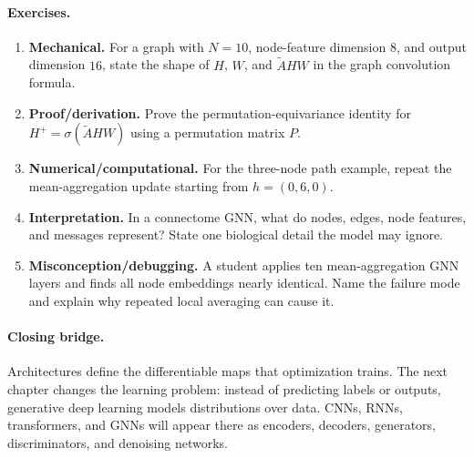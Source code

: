 \paragraph{Exercises.}
\begin{enumerate}[label=\textbf{40.4.\arabic*.}, leftmargin=*]
\item \textbf{Mechanical.} For a graph with \(N=10\), node-feature dimension \(8\), and output dimension \(16\), state the shape of \(H\), \(W\), and \(\widetilde AHW\) in the graph convolution formula.
\item \textbf{Proof/derivation.} Prove the permutation-equivariance identity for \(H^{+}=\sigma(\widetilde AHW)\) using a permutation matrix \(P\).
\item \textbf{Numerical/computational.} For the three-node path example, repeat the mean-aggregation update starting from \(h=(0,6,0)\).
\item \textbf{Interpretation.} In a connectome GNN, what do nodes, edges, node features, and messages represent? State one biological detail the model may ignore.
\item \textbf{Misconception/debugging.} A student applies ten mean-aggregation GNN layers and finds all node embeddings nearly identical. Name the failure mode and explain why repeated local averaging can cause it.
\end{enumerate}

\paragraph{Closing bridge.}
Architectures define the differentiable maps that optimization trains. The next chapter changes the learning problem: instead of predicting labels or outputs, generative deep learning models distributions over data. CNNs, RNNs, transformers, and GNNs will appear there as encoders, decoders, generators, discriminators, and denoising networks.

\clearpage
